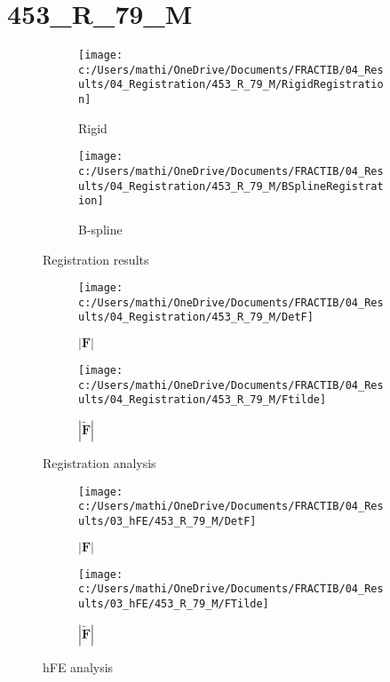 \documentclass{article}%
\begin{document}
%
\newpage%
\section*{453\_R\_79\_M}%
\label{sec:453R79M}%


\begin{figure}[h!]%
\begin{subfigure}[b]{0.5\linewidth}%
\texttt{[image: c:/Users/mathi/OneDrive/Documents/FRACTIB/04\_Results/04\_Registration/453\_R\_79\_M/RigidRegistration]}%
\caption{Rigid}%
\end{subfigure}%
\begin{subfigure}[b]{0.5\linewidth}%
\texttt{[image: c:/Users/mathi/OneDrive/Documents/FRACTIB/04\_Results/04\_Registration/453\_R\_79\_M/BSplineRegistration]}%
\caption{B{-}spline}%
\end{subfigure}%
\caption{Registration results}%
\end{figure}

%


\begin{figure}[h!]%
\begin{subfigure}[b]{0.5\linewidth}%
\texttt{[image: c:/Users/mathi/OneDrive/Documents/FRACTIB/04\_Results/04\_Registration/453\_R\_79\_M/DetF]}%
\caption{$|\mathbf{F}|$}%
\end{subfigure}%
\begin{subfigure}[b]{0.5\linewidth}%
\texttt{[image: c:/Users/mathi/OneDrive/Documents/FRACTIB/04\_Results/04\_Registration/453\_R\_79\_M/Ftilde]}%
\caption{$|\widetilde{\mathbf{F}}|$}%
\end{subfigure}%
\caption{Registration analysis}%
\end{figure}

%


\begin{figure}[h!]%
\begin{subfigure}[b]{0.5\linewidth}%
\texttt{[image: c:/Users/mathi/OneDrive/Documents/FRACTIB/04\_Results/03\_hFE/453\_R\_79\_M/DetF]}%
\caption{$|\mathbf{F}|$}%
\end{subfigure}%
\begin{subfigure}[b]{0.5\linewidth}%
\texttt{[image: c:/Users/mathi/OneDrive/Documents/FRACTIB/04\_Results/03\_hFE/453\_R\_79\_M/FTilde]}%
\caption{$|\widetilde{\mathbf{F}}|$}%
\end{subfigure}%
\caption{hFE analysis}%
\end{figure}
\end{document}
